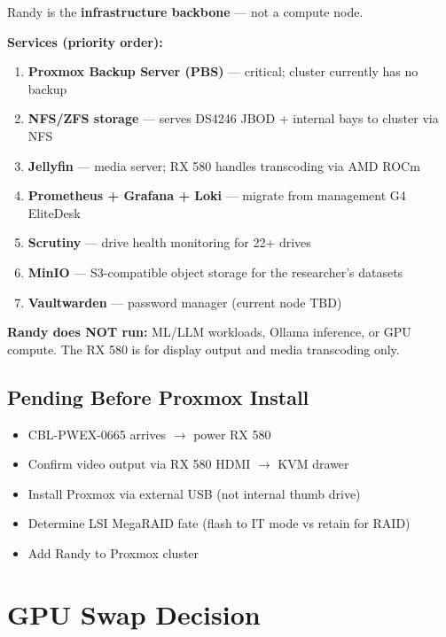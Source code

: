 \documentclass[11pt, letterpaper]{article}
\begin{document}
Randy is the \textbf{infrastructure backbone} — not a compute node.

\textbf{Services (priority order):}
\begin{enumerate}[leftmargin=*, nosep]
    \item \textbf{Proxmox Backup Server (PBS)} — critical; cluster currently has no backup
    \item \textbf{NFS/ZFS storage} — serves DS4246 JBOD + internal bays to cluster via NFS
    \item \textbf{Jellyfin} — media server; RX 580 handles transcoding via AMD ROCm
    \item \textbf{Prometheus + Grafana + Loki} — migrate from management G4 EliteDesk
    \item \textbf{Scrutiny} — drive health monitoring for 22+ drives
    \item \textbf{MinIO} — S3-compatible object storage for the researcher's datasets
    \item \textbf{Vaultwarden} — password manager (current node TBD)
\end{enumerate}

\textbf{Randy does NOT run:} ML/LLM workloads, Ollama inference, or GPU compute. The RX 580 is for display output and media transcoding only.

\subsection{Pending Before Proxmox Install}

\begin{itemize}[leftmargin=*, nosep]
    \item[$\square$] CBL-PWEX-0665 arrives $\rightarrow$ power RX 580
    \item[$\square$] Confirm video output via RX 580 HDMI $\rightarrow$ KVM drawer
    \item[$\square$] Install Proxmox via external USB (not internal thumb drive)
    \item[$\square$] Determine LSI MegaRAID fate (flash to IT mode vs retain for RAID)
    \item[$\square$] Add Randy to Proxmox cluster
\end{itemize}

\section{GPU Swap Decision}
\end{document}
